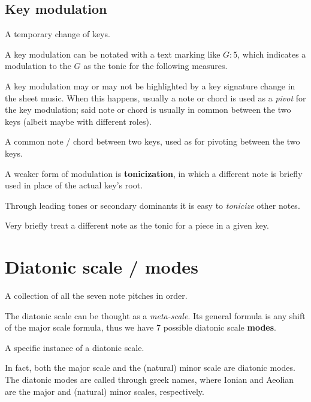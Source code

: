 \subsection{Key modulation}
\begin{definition}
    A temporary change of keys.
\end{definition}

A key modulation can be notated with a text marking like $G:5$, which indicates a modulation to the $G$ as the tonic for the following measures.

A key modulation may or may not be highlighted by a key signature change in the sheet music. When this happens, usually a note or chord is used as a \emph{pivot} for the key modulation; said note or chord is usually in common between the two keys (albeit maybe with different roles).

\begin{definition}[Pivot]
    A common note / chord between two keys, used as for pivoting between the two keys.
\end{definition}

A weaker form of modulation is \textbf{tonicization}, in which a different note is briefly used in place of the actual key's root.

Through leading tones or secondary dominants it is easy to \emph{tonicize} other notes.

\begin{definition}[Tonicization]
    Very briefly treat a different note as the tonic for a piece in a given key.
\end{definition}

\section{Diatonic scale / modes}
\begin{definition}
    A collection of all the seven note pitches in order.
\end{definition}

The diatonic scale can be thought as a \emph{meta-scale}. Its general formula is any shift of the major scale formula, thus we have 7 possible diatonic scale \textbf{modes}.

\begin{definition}
    A specific instance of a diatonic scale.
\end{definition}

In fact, both the major scale and the (natural) minor scale are diatonic modes. The diatonic modes are called through greek names, where {\color{OrangeRed}Ionian} and {\color{RoyalBlue}Aeolian} are the major and (natural) minor scales, respectively.


